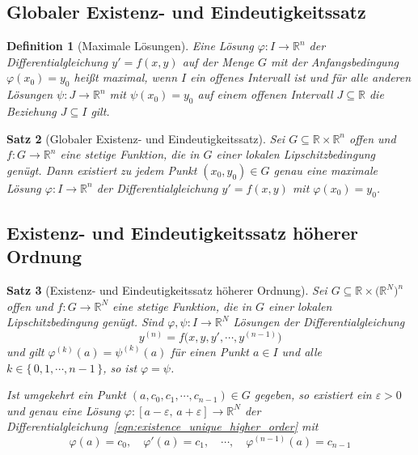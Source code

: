 \documentclass[a4paper, 11pt, accentcolor = tud3b]{tudreport}
\newtheorem{theorem}{Satz}[chapter]
\newtheorem{definition}[theorem]{Definition}
\newcommand{\R}{\mathbb{R}}
\begin{document}
			\subsection{Globaler Existenz- und Eindeutigkeitssatz}
				\begin{definition}[Maximale Lösungen]
					Eine Lösung \( \varphi : I \to \R^n \) der Differentialgleichung \( y' = f(x, y) \) auf der Menge \(G\) mit der Anfangsbedingung \( \varphi(x_0) = y_0 \) heißt \emph{maximal}, wenn \(I\) ein offenes Intervall ist und für alle anderen Lösungen \( \psi : J \to \R^n \) mit \( \psi(x_0) = y_0 \) auf einem offenen Intervall \( J \subseteq \R \) die Beziehung \( J \subseteq I \) gilt.
				\end{definition}
			
				\begin{theorem}[Globaler Existenz- und Eindeutigkeitssatz]
					Sei \( G \subseteq \R \times \R^n \) offen und \( f : G \to \R^n \) eine stetige Funktion, die in \(G\) einer lokalen Lipschitzbedingung genügt. Dann existiert zu jedem Punkt \( (x_0, y_0) \in G \) genau eine maximale Lösung \( \varphi : I \to \R^n \) der Differentialgleichung \( y' = f(x, y) \) mit \( \varphi(x_0) = y_0 \).
				\end{theorem}

			\subsection{Existenz- und Eindeutigkeitssatz höherer Ordnung}
				\begin{theorem}[Existenz- und Eindeutigkeitssatz höherer Ordnung]
					Sei \( G \subseteq \R \times \big(\R^N\big)^n \) offen und \( f : G \to \R^N \) eine stetige Funktion, die in \(G\) einer lokalen Lipschitzbedingung genügt. Sind \( \varphi, \psi : I \to \R^N \) Lösungen der Differentialgleichung
					\begin{equation}
						y^{(n)} = f\big(x, y, y', \cdots, y^{(n - 1)}\big)  \label{eqn:existence_unique_higher_order}
					\end{equation}
					und gilt \( \varphi^{(k)}(a) = \psi^{(k)}(a) \) für einen Punkt \( a \in I \) und alle \( k \in \{\, 0, 1, \cdots, n - 1 \,\} \), so ist \( \varphi = \psi \).
					
					Ist umgekehrt ein Punkt \( (a, c_0, c_1, \cdots, c_{n - 1}) \in G \) gegeben, so existiert ein \( \varepsilon > 0 \) und genau eine Lösung \( \varphi : [a - \varepsilon,\, a + \varepsilon] \to \R^N \) der Differentialgleichung~\ref{eqn:existence_unique_higher_order} mit
					\begin{equation*}
						\varphi(a) = c_0,\quad \varphi'(a) = c_1,\quad \cdots,\quad \varphi^{(n - 1)}(a) = c_{n - 1}
					\end{equation*}
				\end{theorem}
			
\end{document}
